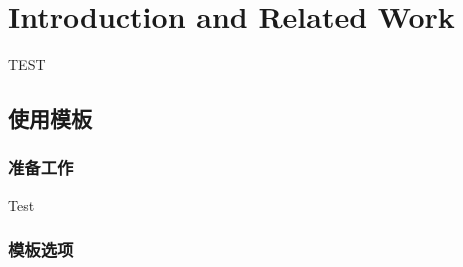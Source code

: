
\chapter{Introduction and Related Work}
\label{chap:intro}

TEST

\section{使用模板}

\subsection{准备工作}
\label{sec:requirements}

Test 


\subsection{模板选项}
\label{sec:thesisoption}

%

